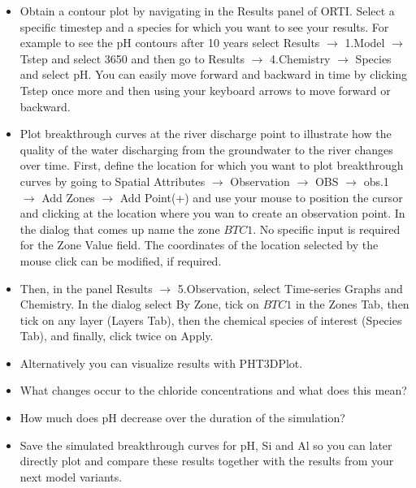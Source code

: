 \begin{itemize}

\item Obtain a contour plot by navigating in the {\color{blue} Results} panel of ORTI.
Select a specific timestep and a species for which you want to see your results.
For example to see the pH contours after 10 years select {\color{blue}Results} $\rightarrow$ {\color{blue}1.Model} 
$\rightarrow$ {\color{blue}Tstep} and select {\color{blue}3650} and then go to   
{\color{blue}Results} $\rightarrow$ {\color{blue}4.Chemistry} 
$\rightarrow$ {\color{blue}Species} and select {\color{blue}pH}.  
You can easily move forward and backward in time by clicking {\color{blue}Tstep} once more and then
using your keyboard arrows to move forward or backward.

\item Plot breakthrough curves at the river discharge point to illustrate how the quality of the
water discharging from the groundwater to the river changes over time.
First, define the location for which you want to plot breakthrough curves by
going to 
{\color{blue}Spatial Attributes} 
$\rightarrow$ {\color{blue}Observation} 
$\rightarrow$ {\color{blue}OBS} 
$\rightarrow$ {\color{blue}obs.1} 
$\rightarrow$ {\color{blue}Add Zones} 
$\rightarrow$ {\color{blue}Add Point(+)}
and use your mouse to position the cursor and clicking at the location
where you wan to create an observation point. In the dialog that comes up name the zone $BTC1$. 
No specific input is required for the {\color{blue}Zone Value} field.
The coordinates of the location selected by the mouse click can be modified, if required.

\item Then, in the panel {\color{blue}Results} $\rightarrow$ {\color{blue}5.Observation}, select {\color{blue}Time-series Graphs and Chemistry}. In the dialog select By Zone, tick on $BTC1$ in the {\color{blue}Zones} Tab, then tick on any layer ({\color{blue}Layers} Tab), then the chemical species of interest ({\color{blue}Species} Tab), and finally, click twice on {\color{blue}Apply}.

\item Alternatively you can visualize results with PHT3DPlot. 

\item What changes occur to the chloride concentrations and what does this mean?

\item How much does pH decrease over the duration of the simulation? 

\item Save the simulated breakthrough curves for pH, Si and Al so you can later directly 
plot and compare these results together with the results from your next model variants.  
 
\end{itemize}


